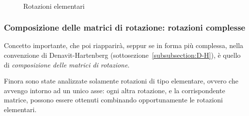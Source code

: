 \begin{figure}
	\centering
	\\
	\caption{Rotazioni elementari}
	\label{fig:RotazioniElementari}
\end{figure}

\subsubsection{Composizione delle matrici di rotazione: rotazioni complesse}
\label{subsubsection:RotComplex}
Concetto importante, che poi riapparirà, seppur se in forma più complessa, nella convenzione di Denavit-Hartenberg (sottosezione~\vref{subsubsection:D-H}), è quello di \emph{composizione delle matrici di rotazione}.

Finora sono state analizzate solamente rotazioni di tipo elementare, ovvero che avvengo intorno ad un unico asse: ogni altra rotazione, e la corrispondente matrice, possono essere ottenuti combinando opportunamente le rotazioni elementari.

